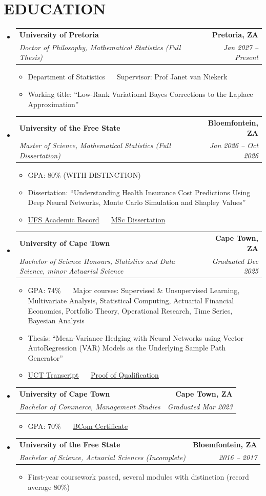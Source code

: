 \documentclass[letterpaper,11pt]{article}
\makeatletter
\newcommand{\ghuser}{https://github.com/thabangTheActuaryCoder}
\newcommand{\recs}{\ghuser/Academic-Records/blob/master}
\newcommand{\resumeItem}[1]{
  \item\small{
    {#1 \vspace{-1pt}}
  }
}
\newcommand{\resumeSubheading}[4]{
  \vspace{-2pt}\item
    \begin{tabular*}{1.0\textwidth}[t]{l@{\extracolsep{\fill}}r}
      \textbf{\large#1} & \textbf{\small #2} \\
      \textit{\large#3} & \textit{\small #4} \\

    \end{tabular*}\vspace{-7pt}
}
\newcommand{\resumeSubHeadingListStart}{\begin{itemize}[leftmargin=0.0in, label={}]}
\newcommand{\resumeSubHeadingListEnd}{\end{itemize}}
\newcommand{\resumeItemListStart}{\begin{itemize}[leftmargin=0.1in]}
\newcommand{\resumeItemListEnd}{\end{itemize}\vspace{-5pt}}
\newcommand{\entryGap}{\vspace{3pt}\needspace{6\baselineskip}}
\newcommand{\doclink}[2]{\href{#1}{\color{blue}\underline{#2}}}
\makeatother
\begin{document}
\section{\color{airforceblue}EDUCATION}
\resumeSubHeadingListStart
    \resumeSubheading
      {University of Pretoria}{Pretoria, ZA}
      {Doctor of Philosophy, Mathematical Statistics (Full Thesis)}{Jan 2027 -- Present}
      \resumeItemListStart
            \resumeItem{\normalsize{Department of Statistics ~\textbar~ Supervisor: Prof Janet van Niekerk}}
            \resumeItem{\normalsize{Working title: ``Low-Rank Variational Bayes Corrections to the Laplace Approximation''}}
      \resumeItemListEnd
    \entryGap
    \resumeSubheading
      {University of the Free State}{Bloemfontein, ZA}
      {Master of Science, Mathematical Statistics (Full Dissertation)}{Jan 2026 -- Oct 2026}
      \resumeItemListStart
            \resumeItem{\normalsize{GPA: 80\% (WITH DISTINCTION)}}
            \resumeItem{\normalsize{Dissertation: ``Understanding Health Insurance Cost Predictions Using Deep Neural Networks, Monte Carlo Simulation and Shapley Values''}}
            \resumeItem{\normalsize{\doclink{\recs/UV_ACADREC_S\%20\%28Baloyi\%20Thabang\%20MSc\%29.pdf}{UFS Academic Record} ~\textbar~ \doclink{\ghuser/Msc-Mathematical-Statistics-Dissertation/blob/main/Baloyi_TBJ_MSc_Mathematical_Statistics_Dissertation_2026.pdf}{MSc Dissertation}}}
      \resumeItemListEnd
    \entryGap
    \resumeSubheading
      {University of Cape Town}{Cape Town, ZA}
      {Bachelor of Science Honours, Statistics and Data Science, minor Actuarial Science}{Graduated Dec 2025}
      \resumeItemListStart
            \resumeItem{\normalsize{GPA: 74\% ~\textbar~ Major courses: Supervised \& Unsupervised Learning, Multivariate Analysis, Statistical Computing, Actuarial Financial Economics, Portfolio Theory, Operational Research, Time Series, Bayesian Analysis}}
            \resumeItem{\normalsize{Thesis: ``Mean-Variance Hedging with Neural Networks using Vector AutoRegression (VAR) Models as the Underlying Sample Path Generator''}}
            \resumeItem{\normalsize{\doclink{\recs/UCT\%20TRANSCRIPT\%202025.pdf}{UCT Transcript} ~\textbar~ \doclink{\recs/Proof\%20of\%20Qualification\%20-\%20BSc.\%20Hons\%20Statistics\%20and\%20Data\%20Sciences.pdf}{Proof of Qualification}}}
      \resumeItemListEnd
    \entryGap
    \resumeSubheading
      {University of Cape Town}{Cape Town, ZA}
      {Bachelor of Commerce, Management Studies}{Graduated Mar 2023}
      \resumeItemListStart
            \resumeItem{\normalsize{GPA: 70\% ~\textbar~ \doclink{\recs/UCT\%20CERTIFICATE.pdf}{BCom Certificate}}}
      \resumeItemListEnd
    \entryGap
    \resumeSubheading
      {University of the Free State}{Bloemfontein, ZA}
      {Bachelor of Science, Actuarial Sciences \textup{(Incomplete)}}{2016 -- 2017}
      \resumeItemListStart
            \resumeItem{\normalsize{First-year coursework passed, several modules with distinction (record average 80\%)}}
      \resumeItemListEnd
\resumeSubHeadingListEnd
\vspace{2pt}
\end{document}
